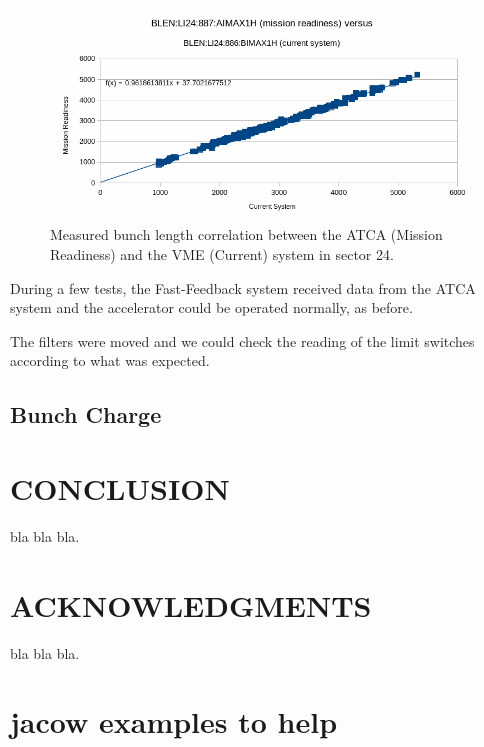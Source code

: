 \documentclass[letter,
               biblatex,     %
               keeplastbox,   %
               ]{jacow}
\begin{document}
\begin{figure}[!htb]
   \centering
   \includegraphics*[width=\columnwidth]{blen_result}
   \caption{Measured bunch length correlation between the ATCA (Mission Readiness) and the VME (Current) system in sector 24.}
   \label{fig:blen_result}
\end{figure}

During a few tests, the Fast-Feedback system received data from the ATCA system and the accelerator could be operated normally, as before.

The filters were moved and we could check the reading of the limit switches according to what was expected.

\subsection{Bunch Charge}


\section{CONCLUSION}

bla bla bla.

\section{ACKNOWLEDGMENTS}

bla bla bla.

\section{jacow examples to help}
\end{document}

